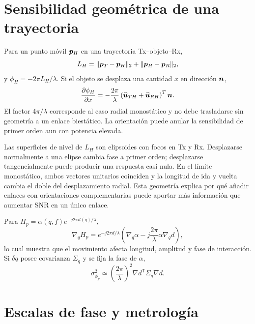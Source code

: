 \section{Sensibilidad geométrica de una trayectoria}
\label{sec:geometry_phase_scales}

Para un punto móvil $\bm{p}_H$ en una trayectoria Tx--objeto--Rx,
\begin{equation}
L_H=\|\bm{p}_T-\bm{p}_H\|_2+\|\bm{p}_H-\bm{p}_R\|_2,
\end{equation}
y $\phi_H=-2\pi L_H/\lambda$. Si el objeto se desplaza una cantidad $x$ en dirección $\bm{n}$,
\begin{equation}
\frac{\partial\phi_H}{\partial x}=-\frac{2\pi}{\lambda}
\left(\widehat{\bm{u}}_{TH}+\widehat{\bm{u}}_{RH}\right)^T\bm{n}.
\label{eq:bistatic_sensitivity}
\end{equation}
El factor $4\pi/\lambda$ corresponde al caso radial monostático y no debe trasladarse sin geometría a un enlace biestático. La orientación puede anular la sensibilidad de primer orden aun con potencia elevada.

Las superficies de nivel de $L_H$ son elipsoides con focos en Tx y Rx. Desplazarse
normalmente a una elipse cambia fase a primer orden; desplazarse tangencialmente
puede producir una respuesta casi nula. En el límite monostático, ambos vectores
unitarios coinciden y la longitud de ida y vuelta cambia el doble del
desplazamiento radial. Esta geometría explica por qué añadir enlaces con
orientaciones complementarias puede aportar más información que aumentar SNR en
un único enlace.

Para $H_p=\alpha(q,f)e^{-j2\pi d(q)/\lambda}$,
\begin{equation}
\nabla_qH_p=e^{-j2\pi d/\lambda}
\left(\nabla_q\alpha-j\frac{2\pi}{\lambda}\alpha\nabla_qd\right),
\label{eq:geometry_phase_jacobian}
\end{equation}
lo cual muestra que el movimiento afecta longitud, amplitud y fase de interacción. Si $\delta q$ posee covarianza $\Sigma_q$ y se fija la fase de $\alpha$,
\begin{equation}
\sigma_{\phi_p}^2\simeq\left(\frac{2\pi}{\lambda}\right)^2
\nabla d^{\mathsf T}\Sigma_q\nabla d.
\label{eq:geometric_phase_uncertainty}
\end{equation}

\section{Escalas de fase y metrología}

